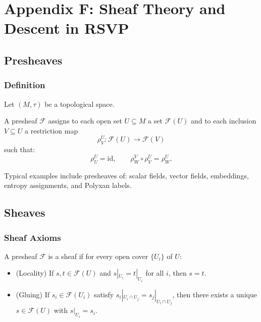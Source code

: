 \chapter*{Appendix F: Sheaf Theory and Descent in RSVP}

\section{Presheaves}

\subsection{Definition}

Let $(M,\tau)$ be a topological space.

\begin{definition}[Presheaf]
A presheaf $\mathcal{F}$ assigns to each open set $U\subseteq M$ a set $\mathcal{F}(U)$ and to each inclusion $V\subseteq U$ a restriction map
\[
\rho^U_V : \mathcal{F}(U) \to \mathcal{F}(V)
\]
such that:
\[
\rho^U_U = \mathrm{id}, \qquad
\rho^V_W \circ \rho^U_V = \rho^U_W.
\]
\end{definition}

Typical examples include presheaves of:
scalar fields, vector fields, embeddings, entropy assignments, and Polyxan labels.

\section{Sheaves}

\subsection{Sheaf Axioms}

\begin{definition}[Sheaf]
A presheaf $\mathcal{F}$ is a sheaf if for every open cover $\{U_i\}$ of $U$:

\begin{itemize}
\item (Locality)  
If $s,t\in\mathcal{F}(U)$ and $s|_{U_i}=t|_{U_i}$ for all $i$, then $s=t$.

\item (Gluing)  
If $s_i \in \mathcal{F}(U_i)$ satisfy  
$s_i|_{U_i\cap U_j} = s_j|_{U_i\cap U_j}$,  
then there exists a unique  
$s \in \mathcal{F}(U)$ with $s|_{U_i}=s_i$.
\end{itemize}
\end{definition}

